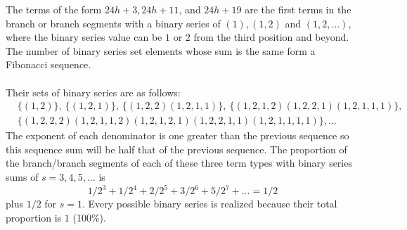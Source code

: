 \documentclass[sn-mathphys-num, pdflatex]{sn-jnl}
\begin{document}
The terms of the form $24h+3, 24h+11$, and $24h+19$ are the first terms in the branch or branch segments with a binary series of $(1), (1,2)$ and $(1,2,\ldots)$, where the binary series value can be $1$ or $2$ from the third position and beyond.
The number of binary series set elements whose sum is the same form a Fibonacci sequence. \\ \\Their sets of binary series are as follows:
$$\begin{array}{ll} &\{(1,2)\},\ \{(1,2,1)\},\ \{(1,2,2) (1,2,1,1) \},\ \{(1,2,1,2)(1,2,2,1)(1,2,1,1,1) \}, \\ &\{(1,2,2,2) (1,2,1,1,2) (1,2,1,2,1) (1,2,2,1,1)(1,2,1,1,1,1) \},\ldots \end{array}$$The exponent of each denominator is one greater than the previous sequence so this sequence sum will be half that of the previous sequence. The proportion of the branch/branch segments of each of these three term types with binary series sums of $s = 3,4,5,\ldots$ is $$1/2^3 + 1/2^4 + 2/2^5 + 3/2^6 + 5/2^7 + \ldots = 1/2$$ plus $1/2$ for $s = 1$. Every possible binary series is realized because their total proportion is $1$ (100\%). 
\end{document}
